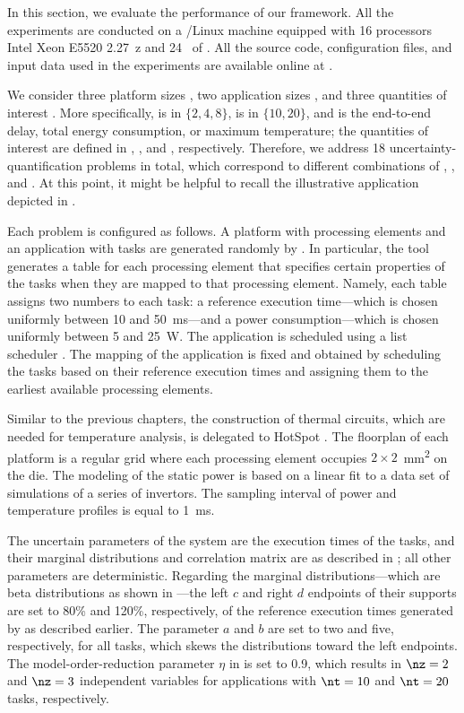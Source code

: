 In this section, we evaluate the performance of our framework. All the
experiments are conducted on a /Linux machine equipped with 16
processors Intel Xeon E5520 2.27~z and 24~ of . All the
source code, configuration files, and input data used in the experiments are
available online at \cite{eslab2017}.

We consider three platform sizes \np, two application sizes \nt, and three
quantities of interest \g. More specifically, \np is in $\{ 2, 4, 8 \}$, \nt is
in $\{ 10, 20 \}$, and \g is the end-to-end delay, total energy consumption, or
maximum temperature; the quantities of interest are defined in
, , and
, respectively. Therefore, we address 18
uncertainty-quantification problems in total, which correspond to different
combinations of \np, \nt, and \g. At this point, it might be helpful to recall
the illustrative application depicted in .

Each problem is configured as follows. A platform with \np processing elements
and an application with \nt tasks are generated randomly by 
\cite{dick1998}. In particular, the tool generates a table for each processing
element that specifies certain properties of the tasks when they are mapped to
that processing element. Namely, each table assigns two numbers to each task: a
reference execution time---which is chosen uniformly between 10 and 50~ms---and
a power consumption---which is chosen uniformly between 5 and 25~W. The
application is scheduled using a list scheduler \cite{adam1974}. The mapping of
the application is fixed and obtained by scheduling the tasks based on their
reference execution times and assigning them to the earliest available
processing elements.

Similar to the previous chapters, the construction of thermal  circuits,
which are needed for temperature analysis, is delegated to HotSpot
\cite{skadron2003}. The floorplan of each platform is a regular grid where each
processing element occupies $2 \times 2$~mm\textsuperscript{2} on the die. The
modeling of the static power is based on a linear fit to a data set of
 simulations of a series of  invertors. The sampling interval
of power and temperature profiles is equal to 1~ms.

The uncertain parameters \vu of the system are the execution times of the tasks,
and their marginal distributions and correlation matrix are as described in
; all other parameters are deterministic.
Regarding the marginal distributions---which are beta distributions as shown in
---the left $c$ and right $d$ endpoints of their
supports are set to 80\% and 120\%, respectively, of the reference execution
times generated by  as described earlier. The parameter $a$ and $b$ are
set to two and five, respectively, for all tasks, which skews the distributions
toward the left endpoints. The model-order-reduction parameter $\eta$ in
 is set to 0.9, which results in $\nz = 2$ and $\nz
= 3$ independent variables for applications with $\nt = 10$ and $\nt = 20$
tasks, respectively.

